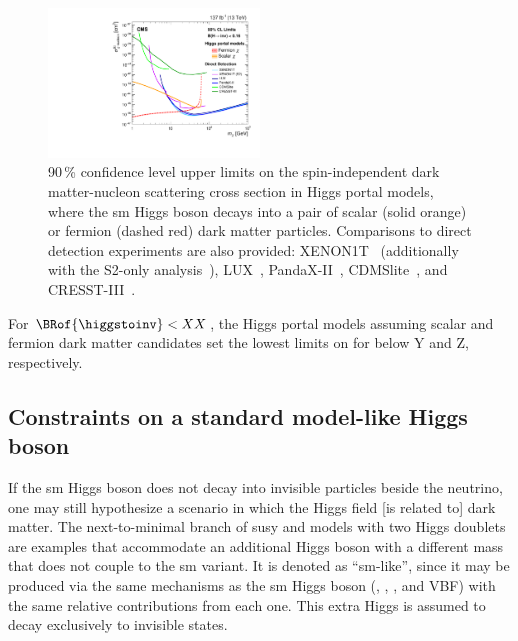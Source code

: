 \begin{figure}
    \centering
    \includegraphics[width=0.5\textwidth]{figures/dark_matter_limit/higgsPortalDM.pdf}
    \caption[90\,\% confidence level upper limits on the spin-independent dark matter-nucleon scattering cross section in Higgs portal models, where the standard model Higgs boson decays into a pair of scalar (solid orange) or fermion (dashed red) dark matter particles]{90\,\% confidence level upper limits on the spin-independent dark matter-nucleon scattering cross section in Higgs portal models, where the \acrlong{sm} Higgs boson decays into a pair of scalar (solid orange) or fermion (dashed red) dark matter particles. Comparisons to direct detection experiments are also provided: XENON1T~\cite{Aprile:2018dbl} (additionally with the S2-only analysis~\cite{Aprile:2019xxb}), LUX~\cite{Akerib:2016vxi}, PandaX-II~\cite{Cui:2017nnn}, CDMSlite~\cite{Agnese:2018gze}, and CRESST-III~\cite{Abdelhameed:2019hmk}.}
    \label{fig:higgs_portal_dm_limits}
\end{figure}

For $\BRof{\higgstoinv} < XX$, the Higgs portal models assuming scalar and fermion dark matter candidates set the lowest limits on \xsecSI for \mqdark below Y and Z\GeV, respectively.





\subsection{Constraints on a standard model-like Higgs boson}
\label{subsec:htoinv_dark_matter_bsm_higgs}

If the \acrshort{sm} Higgs boson does not decay into invisible particles beside the neutrino, one may still hypothesize a scenario in which the Higgs field [is related to] dark matter. The next-to-minimal branch of \acrlong{susy} and models with two Higgs doublets are examples that accommodate an additional Higgs boson with a different mass that does not couple to the \acrshort{sm} variant. It is denoted as ``\acrlong{sm}-like'', since it may be produced via the same mechanisms as the \acrshort{sm} Higgs boson (\ttH, \VH, \ggF, and \acrshort{VBF}) with the same relative contributions from each one. This extra Higgs is assumed to decay exclusively to invisible states.

